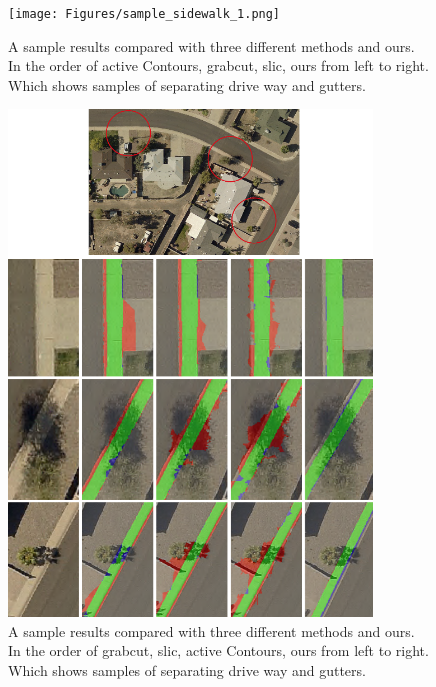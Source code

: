 \begin{figure}[H]
    \centering
    \texttt{[image: Figures/sample\_sidewalk\_1.png]}
    \caption[Methods Comparison on Sample Sidewalk 2]{A sample results compared with three different methods and ours. In the order of active Contours, grabcut, slic, ours from left to right. Which shows samples of separating drive way and gutters.}
    \label{fig:Sample_2_compare}
\end{figure}

\begin{figure}[H]
    \centering
    \includegraphics[width=0.86\textwidth]{Figures/2_comparison_needed.png}
    \caption[Methods Comparison on Sample Sidewalk 3]{A sample results compared with three different methods and ours. In the order of grabcut, slic, active Contours, ours from left to right. Which shows samples of separating drive way and gutters.}
    \label{fig:Sample_3_compare}
\end{figure}



